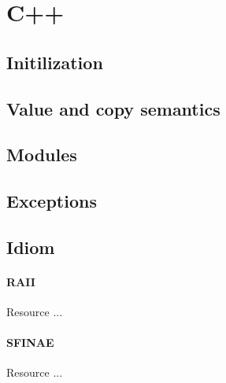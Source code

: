 \section{C++}  
\subsection{Initilization}
\subsection{Value and copy semantics}
\subsection{Modules}
\subsection{Exceptions}
\subsection{Idiom}
\paragraph{RAII} Resource ...
\paragraph{SFINAE} Resource ...

